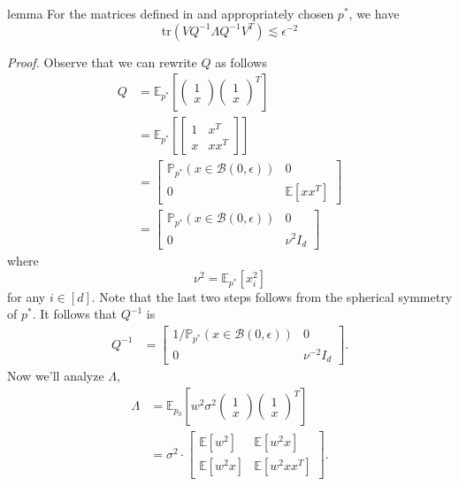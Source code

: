 \documentclass[11pt]{article}
\begin{document}
\begin{restatable}{lemma}{} \label{lemma: trace bound}
    For the matrices defined in  and appropriately chosen $p^*$, we have
    \[\text{tr}(VQ^{-1}\Lambda Q^{-1}V^T) \lesssim \epsilon^{-2} \]
\end{restatable}
\noindent \textit{Proof.} Observe that we can rewrite $Q$ as follows
\begin{align}
    Q &= \mathbb{E}_{p^*}\left[\begin{pmatrix}
        1 \\ x
    \end{pmatrix}\begin{pmatrix}
        1 \\ x
    \end{pmatrix}^T\right] \\
    &= \mathbb{E}_{p^*}\left[
    \begin{bmatrix}
         1 & x^T \\
         x & xx^T
    \end{bmatrix}\right] \\
    &= \begin{bmatrix}
         \mathbb{P}_{p^*}(x \in \mathcal{B}(0, \epsilon)) & 0 \\
         0 & \mathbb{E}\left[xx^T\right]
    \end{bmatrix} \\
    &= \begin{bmatrix}
         \mathbb{P}_{p^*}(x \in \mathcal{B}(0, \epsilon)) & 0 \\
         0 & \nu^2I_d
    \end{bmatrix}
\end{align}
where
\[\nu^2 = \mathbb{E}_{p^*}[x_i^2]\]
for any $i \in [d]$. Note that the last two steps follows from the spherical symmetry of $p^*$. It follows that $Q^{-1}$ is
\begin{align}
    Q^{-1} &= \begin{bmatrix}
         1/\mathbb{P}_{p^*}(x \in \mathcal{B}(0, \epsilon)) & 0 \\
         0 & \nu^{-2}I_d
    \end{bmatrix}.
\end{align}
Now we'll analyze $\Lambda$, 
\begin{align}
    \Lambda &= \mathbb{E}_{p_0}\left[w^2\sigma^2\begin{pmatrix}
        1 \\ x
    \end{pmatrix}\begin{pmatrix}
        1 \\ x
    \end{pmatrix}^T\right] \\
    &= 
    \sigma^2\cdot\begin{bmatrix}
         \mathbb{E}[w^2] & \mathbb{E}[w^2x] \\
         \mathbb{E}[w^2x] & \mathbb{E}[w^2xx^T]
    \end{bmatrix}.
\end{align}
\end{document}
